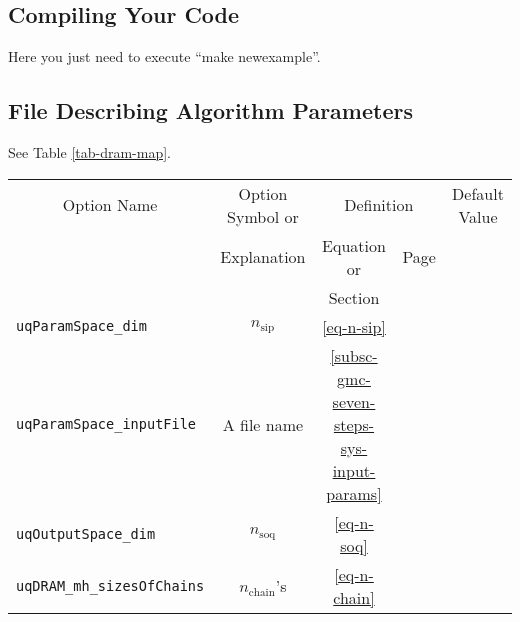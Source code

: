 \subsection{Compiling Your Code}\label{subsc-gmc-seven-steps-compile}

Here you just need to execute ``make newexample''.

\subsection{File Describing Algorithm Parameters}\label{subsc-gmc-seven-steps-alg-params}

See Table \ref{tab-dram-map}.

\begin{sidewaystable}[h]
\begin{center}
\begin{tabular}{|l|c|c|c|c|}
\hline
\multicolumn{1}{|c|}{Option Name}        & Option Symbol or                    & \multicolumn{2}{c|}{Definition}                                                                 & Default Value \\
\cline{3-4}
                                         & Explanation                         & Equation or                                  & Page                                             &               \\
                                         &                                     & Section                                      &                                                  &               \\
\hline
\verb=uqParamSpace_dim=                  & $n_{\text{sip}}$                    & \eqref{eq-n-sip}                             & \pageref{eq-n-sip}                               &               \\
\hline
\verb=uqParamSpace_inputFile=            & A file name                         & \ref{subsc-gmc-seven-steps-sys-input-params} & \pageref{subsc-gmc-seven-steps-sys-input-params} &               \\
\hline
\verb=uqOutputSpace_dim=                 & $n_{\text{soq}}$                    & \eqref{eq-n-soq}                             & \pageref{eq-n-soq}                               &               \\
\hline
\verb=uqDRAM_mh_sizesOfChains=           & $n_{\text{chain}}$'s                & \eqref{eq-n-chain}                           & \pageref{eq-n-chain}                             &               \\

\end{tabular}
\end{center}
\end{sidewaystable}
